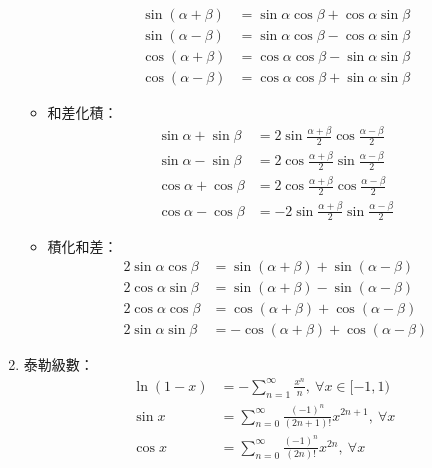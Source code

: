\begin{enumerate}
\begin{itemize}
\begin{subequations}
                \begin{align}
                    \sin(\alpha + \beta) & = \sin\alpha\cos\beta + \cos\alpha\sin\beta \\
                    \sin(\alpha - \beta) & = \sin\alpha\cos\beta - \cos\alpha\sin\beta \\
                    \cos(\alpha + \beta) & = \cos\alpha\cos\beta - \sin\alpha\sin\beta \\
                    \cos(\alpha - \beta) & = \cos\alpha\cos\beta + \sin\alpha\sin\beta
                \end{align}
            \end{subequations}
        \item 和差化積： \begin{subequations}
            \begin{align}
                \sin\alpha + \sin\beta & = 2\sin\frac{\alpha + \beta}{2}\cos\frac{\alpha - \beta}{2} \\
                \sin\alpha - \sin\beta & = 2\cos\frac{\alpha + \beta}{2}\sin\frac{\alpha - \beta}{2} \\
                \cos\alpha + \cos\beta & = 2\cos\frac{\alpha + \beta}{2}\cos\frac{\alpha - \beta}{2} \\
                \cos\alpha - \cos\beta & = -2\sin\frac{\alpha + \beta}{2}\sin\frac{\alpha - \beta}{2}
            \end{align}
        \end{subequations}
        \item 積化和差： \begin{subequations}
            \begin{align}
                2\sin\alpha\cos\beta & = \sin(\alpha + \beta) + \sin(\alpha - \beta) \\
                2\cos\alpha\sin\beta & = \sin(\alpha + \beta) - \sin(\alpha - \beta) \\
                2\cos\alpha\cos\beta & = \cos(\alpha + \beta) + \cos(\alpha - \beta) \\
                2\sin\alpha\sin\beta & = -\cos(\alpha + \beta) + \cos(\alpha - \beta)
            \end{align}
        \end{subequations}
    \end{itemize}
    \item 泰勒級數：\begin{subequations}
        \begin{align}
            \ln(1 - x) & = -\sum_{n = 1}^{\infty}\frac{x^n}{n}, \ \forall x \in [-1, 1) \\
            \sin x & = \sum_{n = 0}^{\infty}\frac{(-1)^n}{(2n + 1)!}x^{2n + 1}, \ \forall x \\
            \cos x & = \sum_{n = 0}^{\infty}\frac{(-1)^n}{(2n)!}x^{2n}, \ \forall x
        \end{align}
    \end{subequations}
\end{enumerate}

\pagebreak